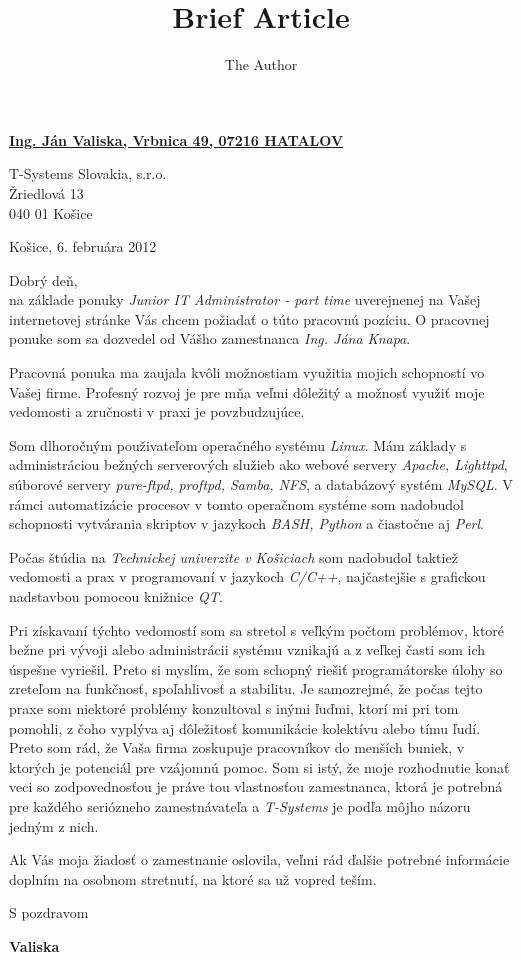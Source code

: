 \documentclass[12pt]{article} %
\title{Brief Article}
\author{The Author}
\begin{document}
\thispagestyle{empty}
\begin{center}
    \underline{\bf Ing. Ján Valiska, Vrbnica 49, 07216 HATALOV}
\end{center}
\vfill
\begin{flushleft}
    T-Systems Slovakia, s.r.o.\\
    Žriedlová 13\\
    040 01 Košice
\end{flushleft}
\begin{flushright}
    Košice, 6. februára 2012
\end{flushright}
\vfill

Dobrý deň,\\
na základe ponuky \textit{Junior IT Administrator - part time} uverejnenej
na Vašej internetovej stránke Vás chcem požiadať o túto pracovnú pozíciu.
O pracovnej ponuke som sa dozvedel od Vášho zamestnanca \textit{Ing. Jána Knapa}.

Pracovná ponuka ma zaujala kvôli možnostiam využitia mojich schopností vo Vašej firme.
Profesný rozvoj je pre mňa veľmi dôležitý a možnosť využiť moje vedomosti a zručnosti v praxi je povzbudzujúce.

Som dlhoročným použivateľom operačného systému \textit{Linux}. Mám základy s administráciou bežných serverových služieb ako webové servery \textit{Apache, Lighttpd}, súborové servery \textit{pure-ftpd, proftpd, Samba, NFS}, a databázový systém \textit{MySQL}. V rámci automatizácie procesov v tomto operačnom systéme som nadobudol schopnosti vytvárania skriptov v jazykoch \textit{BASH, Python} a čiastočne aj \textit{Perl}.

Počas štúdia na \textit{Technickej univerzite v Košiciach} som nadobudol taktiež vedomosti a prax v programovaní v jazykoch \textit{C/C++}, najčastejšie s grafickou nadstavbou pomocou  knižnice \textit{QT}.

Pri získavaní týchto vedomostí som sa stretol s veľkým počtom problémov, ktoré bežne pri vývoji alebo administrácii systému vznikajú a z veľkej časti som ich úspešne vyriešil. Preto si myslím, že som schopný riešiť programátorske úlohy so zreteľom na funkčnosť, spoľahlivosť a stabilitu. Je samozrejmé, že počas tejto praxe som niektoré problémy konzultoval s inými ľuďmi, ktorí mi pri tom pomohli, z čoho vyplýva aj dôležitosť komunikácie kolektívu alebo tímu ľudí. Preto som rád, že Vaša firma
zoskupuje pracovníkov do menších buniek, v ktorých je potenciál pre vzájomnú pomoc. Som si istý, že moje rozhodnutie konať veci so zodpovednosťou je práve tou vlastnosťou zamestnanca, ktorá je potrebná pre každého seriózneho zamestnávateľa a \textit{T-Systems} je podľa môjho názoru jedným z nich.

Ak Vás moja žiadosť o zamestnanie oslovila, veľmi rád ďalšie potrebné informácie doplním na osobnom stretnutí, na ktoré sa už vopred teším.

S pozdravom

\begin{flushright}
    \bf Valiska
\end{flushright}
\vfill
\vfill
\end{document}
